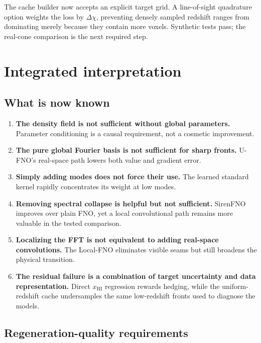 \documentclass[11pt,a4paper]{article}
\newcommand{\xhi}{x_{\mathrm{HI}}}
\begin{document}
The cache builder now accepts an explicit target grid. A line-of-sight
quadrature option weights the loss by \(\Delta\chi\), preventing densely
sampled redshift ranges from dominating merely because they contain more
voxels. Synthetic tests pass; the real-cone comparison is the next required
step.

\section{Integrated interpretation}

\subsection{What is now known}

\begin{enumerate}
  \item \textbf{The density field is not sufficient without global parameters.}
  Parameter conditioning is a causal requirement, not a cosmetic improvement.

  \item \textbf{The pure global Fourier basis is not sufficient for sharp
  fronts.} U-FNO's real-space path lowers both value and gradient error.

  \item \textbf{Simply adding modes does not force their use.} The learned
  standard kernel rapidly concentrates its weight at low modes.

  \item \textbf{Removing spectral collapse is helpful but not sufficient.}
  SirenFNO improves over plain FNO, yet a local convolutional path remains more
  valuable in the tested comparison.

  \item \textbf{Localizing the FFT is not equivalent to adding real-space
  convolutions.} The Local-FNO eliminates visible seams but still broadens the
  physical transition.

  \item \textbf{The residual failure is a combination of target uncertainty
  and data representation.} Direct \(\xhi\) regression rewards hedging, while
  the uniform-redshift cache undersamples the same low-redshift fronts used to
  diagnose the models.
\end{enumerate}

\subsection{Regeneration-quality requirements}
\end{document}
